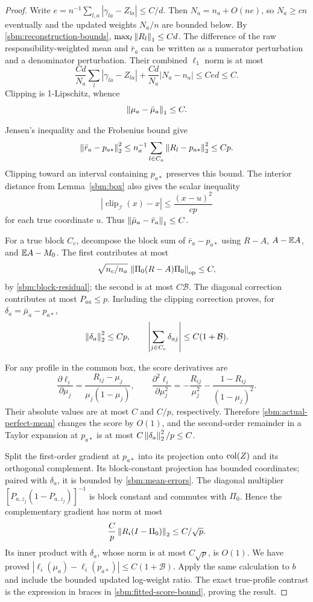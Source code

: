 \begin{proof}
Write $e=n^{-1}\sum_{l,a}|\gamma_{la}-Z_{la}|\le C/d$.
Then $N_a=n_a+O(ne)$, so $N_a\ge cn$ eventually and the updated
weights $N_a/n$ are bounded below. By
\eqref{sbm:reconstruction-bounds}, $\max_l\left\lVert R_l\right\rVert_1\le Cd$.
The difference of the raw responsibility-weighted mean and $\bar r_a$
can be written as a numerator perturbation and a denominator
perturbation. Their combined $\ell_1$ norm is at most
\[
 \frac{Cd}{N_a}\sum_l|\gamma_{la}-Z_{la}|
 +\frac{Cd}{N_a}|N_a-n_a|
 \le Ced\le C.
\]
Clipping is 1-Lipschitz, whence
\begin{equation}
 \left\lVert\mu_a-\bar\mu_a\right\rVert_1\le C.
 \label{sbm:actual-perfect-mean}
\end{equation}

Jensen's inequality and the Frobenius bound give
\[
 \left\lVert\bar r_a-p_{a*}\right\rVert_2^2
 \le n_a^{-1}\sum_{l\in C_a}\left\lVert R_l-p_{a*}\right\rVert_2^2\le Cp.
\]
Clipping toward an interval containing $p_{a*}$ preserves this bound.
The interior distance from Lemma~\ref{sbm:box} also gives the scalar
inequality
\[
 |\operatorname{clip}_{\mathcal I}(x)-x|
 \le\frac{(x-u)^2}{cp}
\]
for each true coordinate $u$. Thus
$\left\lVert\bar\mu_a-\bar r_a\right\rVert_1\le C$.

For a true block $C_c$, decompose the block sum of
$\bar r_a-p_{a*}$ using $R-A$, $A-\mathbb E A$, and $\mathbb E A-M_0$.
The first contributes at most
\[
 \sqrt{n_c/n_a}\,
 \left\lVert\Pi_0(R-A)\Pi_0\right\rVert_{\mathrm{op}}\le C,
\]
by \eqref{sbm:block-residual}; the second is at most $C\mathcal B$.
The diagonal correction contributes at most $P_{aa}\le p$.
Including the clipping correction proves, for
$\delta_a=\bar\mu_a-p_{a*}$,
\begin{equation}
 \left\lVert\delta_a\right\rVert_2^2\le Cp,
 \qquad
 \left|\sum_{j\in C_c}\delta_{aj}\right|
 \le C(1+\mathcal B).
 \label{sbm:mean-errors}
\end{equation}

For any profile in the common box, the score derivatives are
\[
 \frac{\partial\ell_i}{\partial\mu_j}
 =\frac{R_{ij}-\mu_j}{\mu_j(1-\mu_j)},\qquad
 \frac{\partial^2\ell_i}{\partial\mu_j^2}
 =-\frac{R_{ij}}{\mu_j^2}
  -\frac{1-R_{ij}}{(1-\mu_j)^2}.
\]
Their absolute values are at most $C$ and $C/p$, respectively.
Therefore \eqref{sbm:actual-perfect-mean} changes the score by $O(1)$,
and the second-order remainder in a Taylor expansion at $p_{a*}$ is
at most $C\left\lVert\delta_a\right\rVert_2^2/p\le C$.

Split the first-order gradient at $p_{a*}$ into its projection onto
$\operatorname{col}(Z)$ and its orthogonal complement. Its block-constant
projection has bounded coordinates; paired with $\delta_a$, it is
bounded by \eqref{sbm:mean-errors}. The diagonal multiplier
$[P_{a,z_j}(1-P_{a,z_j})]^{-1}$ is block constant and commutes with
$\Pi_0$. Hence the complementary gradient has norm at most
\[
 \frac C p\left\lVert R_i(I-\Pi_0)\right\rVert_2\le C/\sqrt p.
\]
Its inner product with $\delta_a$, whose norm is at most $C\sqrt p$,
is $O(1)$. We have proved
$|\ell_i(\mu_a)-\ell_i(p_{a*})|\le C(1+\mathcal B)$.
Apply the same calculation to $b$ and include the bounded updated
log-weight ratio. The exact true-profile contrast is the expression
in braces in \eqref{sbm:fitted-score-bound}, proving the result.
\end{proof}

